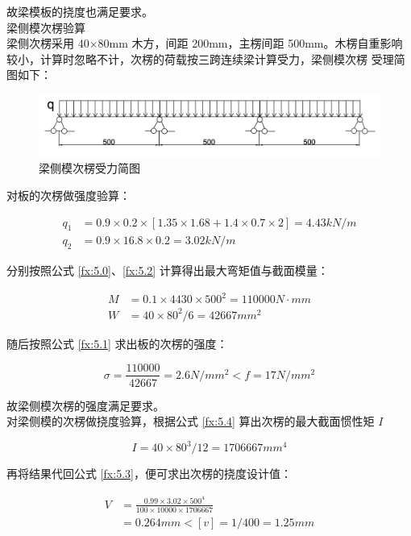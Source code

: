 故梁模板的挠度也满足要求。\\

 梁侧模次楞验算\\

梁侧次楞采用 40×80mm 木方，间距 200mm，主楞间距 500mm。木楞自重影响较小，计算时忽略不计，次楞的荷载按三跨连续梁计算受力，梁侧模次楞
受理简图如下：

\begin{figure}[thbp!]
    \centering
    \includegraphics[width=1.0\linewidth]{figure/c5f2.png}
    \caption{梁侧模次楞受力简图}
    \label{fig:c5f2b}
\end{figure}

对板的次楞做强度验算：

\begin{align*}
    q_1&=0.9\times 0.2\times [1.35\times 1.68+1.4\times0.7\times 2]=4.43 kN/m \\
    q_2&=0.9\times 16.8\times 0.2=3.02 kN/m
\end{align*}

分别按照公式 \ref{fx:5.0}、\ref{fx:5.2} 计算得出最大弯矩值与截面模量：

\begin{align*}
    M&=0.1\times 4430\times 500^2=110000 N \cdot mm\\
    W&=40\times 80^2 /6=42667 mm^2
\end{align*}

随后按照公式 \ref{fx:5.1} 求出板的次楞的强度：

\[
    \sigma = \frac{110000}{42667}=2.6 N/mm^2< f=17N/mm^2
\]

故梁侧模次楞的强度满足要求。\\

对梁侧模的次楞做挠度验算，根据公式 \ref{fx:5.4} 算出次楞的最大截面惯性矩 $I$

\[
    I=40\times 80^3 /12=1706667 mm^4
\]

再将结果代回公式 \ref{fx:5.3}，便可求出次楞的挠度设计值：

\begin{align*}
    V&=\frac{0.99\times 3.02 \times 500^4}{100\times 10000\times 1706667}\\
    &=0.264 mm<[v]=1/400=1.25mm
\end{align*}

